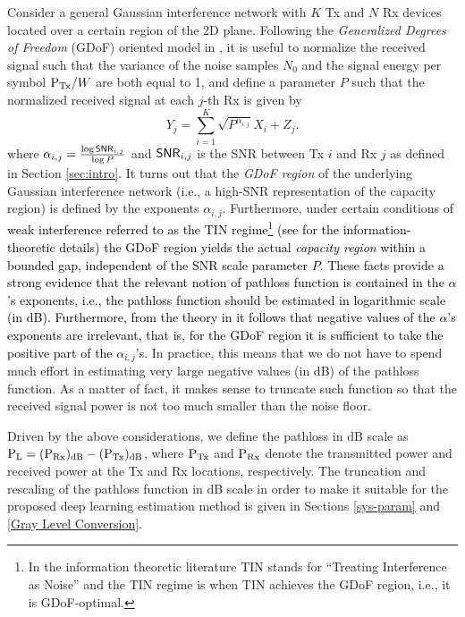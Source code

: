\documentclass[10pt,a4paper]{article}
\begin{document}
Consider a general Gaussian interference network with $K$ Tx and $N$ Rx devices located over a certain region of the 2D plane. Following the {\em Generalized Degrees of Freedom} (GDoF) oriented model in \cite{TINJafar}, it is useful to normalize  the received signal such that the variance of the noise samples $N_0$ 
and the signal energy per symbol $\textup{P}_{\textup{Tx}}/W$ are both equal to 1, and define a parameter $P$ such that the normalized received signal at each $j$-th Rx is given by 
\begin{equation} \label{TIN-model}
Y_j = \sum_{i=1}^K \sqrt{P^{\alpha_{i,j}}} X_i + Z_j.
\end{equation}
where $\alpha_{i,j} = \frac{\log {\sf SNR}_{i,j}}{\log P}$ and ${\sf SNR}_{i,j}$ is the SNR between Tx $i$ and Rx $j$ as defined in Section \ref{sec:intro}. 
It turns out that the {\em GDoF region} of the underlying Gaussian interference network
(i.e., a high-SNR representation of the capacity region) is defined by the exponents $\alpha_{i,j}$. 
Furthermore, under certain conditions \textcolor{black}{of weak interference referred to as the TIN regime\footnote{In the information theoretic literature TIN stands for ``Treating Interference as Noise'' and the TIN regime is when TIN achieves the GDoF region, i.e., 
it is GDoF-optimal.} (see \cite{TINJafar,TINCaire} for the information-theoretic details) 
the GDoF region yields the actual {\em capacity region} within a bounded gap, independent of the SNR scale parameter $P$. 
These facts provide a strong evidence that the relevant notion of pathloss function is contained in the $\alpha$'s exponents, i.e., the pathloss function should be estimated in logarithmic scale (in dB).  
Furthermore, from the theory in \cite{TINJafar} it follows that 
negative values of the $\alpha$'s exponents are irrelevant, that is, for the GDoF region it is sufficient to take the positive 
part of the $\alpha_{i,j}$'s.} 
In practice, this means that we do not have to spend much effort in estimating very large negative values (in dB) 
of the pathloss function. As a matter of fact, it makes sense to truncate such function so that the received signal power 
is not too much smaller than the noise floor. 

Driven by the above considerations, we define the pathloss %
 in dB scale 
as $\textup{P}_{\textup{L}} = (\textup{P}_{\textup{Rx}})_{\rm dB}-(\textup{P}_{\textup{Tx}})_{\rm dB}$,
where $\textup{P}_{\textup{Tx}}$ and $\textup{P}_{\textup{Rx}}$ denote the transmitted power and received power at the Tx and Rx locations, respectively. 
The truncation and rescaling of the pathloss function in dB scale in order to make it suitable for
the proposed deep learning estimation method is given in Sections \ref{sys-param} and \ref{Gray Level Conversion}.  
\end{document}
